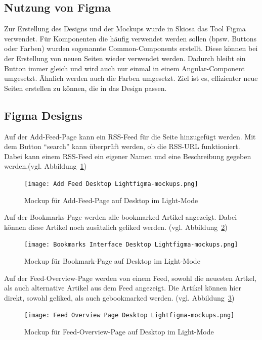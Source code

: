 \subsection{Nutzung von Figma}

Zur Erstellung des Designs und der Mockups wurde in Skiosa das Tool Figma verwendet. 
Für Komponenten die häufig verwendet werden sollen (bpsw. Buttons oder Farben) wurden sogenannte Common-Components erstellt.
Diese können bei der Erstellung von neuen Seiten wieder verwendet werden. 
Dadurch bleibt ein Button immer gleich und wird auch nur einmal in einem Angular-Component umgesetzt.
Ähnlich werden auch die Farben umgesetzt. 
Ziel ist es, effizienter neue Seiten erstellen zu können, die in das Design passen.

\subsection{Figma Designs}

Auf der Add-Feed-Page kann ein RSS-Feed für die Seite hinzugefügt werden. Mit dem Button \enquote{search} kann überprüft werden, ob die RSS-URL funktioniert.
Dabei kann einem RSS-Feed ein eigener Namen und eine Beschreibung gegeben werden.(vgl. Abbildung~\ref{fig:Add Feed Desktop Light}) 
\begin{figure}[H]
    \texttt{[image: Add Feed Desktop Lightfigma-mockups.png]}
    \caption{Mockup für Add-Feed-Page auf Desktop im Light-Mode}
    \label{fig:Add Feed Desktop Light}
\end{figure}

Auf der Bookmarks-Page werden alle bookmarked Artikel angezeigt.
Dabei können diese Artikel noch zusätzlich geliked werden. (vgl. Abbildung~\ref{fig:Bookmarks Interface Desktop Light})

\begin{figure}[H]
    \texttt{[image: Bookmarks Interface Desktop Lightfigma-mockups.png]}
    \caption{Mockup für Bookmark-Page auf Desktop im Light-Mode}
    \label{fig:Bookmarks Interface Desktop Light}
\end{figure}

Auf der Feed-Overview-Page werden von einem Feed, sowohl die neuesten Artkel, als auch alternative Artikel aus dem Feed angezeigt.
Die Artikel können hier direkt, sowohl geliked, als auch gebookmarked werden. (vgl. Abbildung~\ref{fig:Feed Overview Page Light Desktop})

\begin{figure}[H]
    \texttt{[image: Feed Overview Page Desktop Lightfigma-mockups.png]}
    \caption{Mockup für Feed-Overview-Page auf Desktop im Light-Mode}
    \label{fig:Feed Overview Page Light Desktop}
\end{figure}

